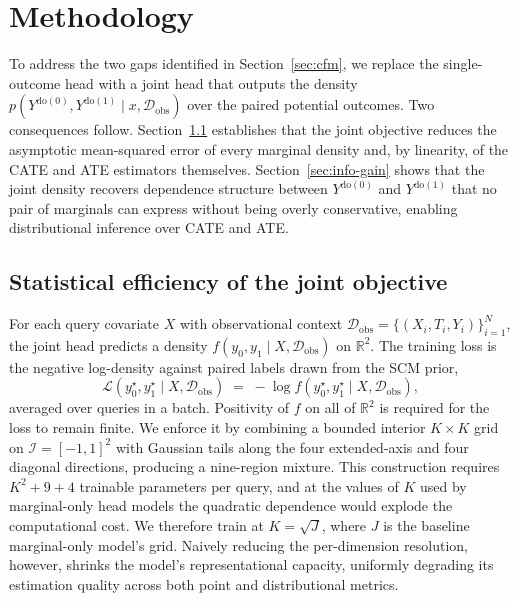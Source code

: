 \documentclass[11pt]{article}
\begin{document}
\section{Methodology}
\label{sec:joint-head}

To address the two gaps identified in Section~\ref{sec:cfm}, we replace the single-outcome head with a joint head that outputs the density $p(Y^{\mathrm{do}(0)}, Y^{\mathrm{do}(1)} \mid x, \mathcal{D}_{\text{obs}})$ over the paired potential outcomes. Two consequences follow. Section~\ref{sec:performance} establishes that the joint objective reduces the asymptotic mean-squared error of every marginal density and, by linearity, of the CATE and ATE estimators themselves. Section~\ref{sec:info-gain} shows that the joint density recovers dependence structure between $Y^{\mathrm{do}(0)}$ and $Y^{\mathrm{do}(1)}$ that no pair of marginals can express without being overly conservative, enabling distributional inference over CATE and ATE.

\subsection{Statistical efficiency of the joint objective}
\label{sec:performance}

For each query covariate $X$ with observational context
$\mathcal{D}_{\mathrm{obs}} = \{(X_i, T_i, Y_i)\}_{i=1}^{N}$, the joint head predicts a density $f(y_0, y_1 \mid X, \mathcal{D}_{\mathrm{obs}})$ on $\mathbb{R}^2$. The training loss is the negative log-density against paired labels drawn from the SCM prior,
\begin{equation}
  \mathcal{L}(y_0^\star, y_1^\star \mid X, \mathcal{D}_{\mathrm{obs}})
  \;=\;
  -\log f(y_0^\star, y_1^\star \mid X, \mathcal{D}_{\mathrm{obs}}),
  \label{eq:nll}
\end{equation}
averaged over queries in a batch. Positivity of $f$ on all of $\mathbb{R}^2$ is required for the loss to remain finite. We enforce it by combining a bounded interior $K \times K$ grid on $\mathcal{I} = [-1,1]^2$ with Gaussian tails along the four extended-axis and four diagonal directions, producing a nine-region mixture. This construction requires $K^2 + 9 + 4$ trainable parameters per query, and at the values of $K$ used by marginal-only head models the quadratic dependence would explode the computational cost. We therefore train at $K=\sqrt{J}$, where $J$ is the baseline marginal-only model's grid. Naively reducing the per-dimension resolution, however, shrinks the
model's representational capacity, uniformly degrading its estimation quality across both point and distributional metrics.  
\end{document}

